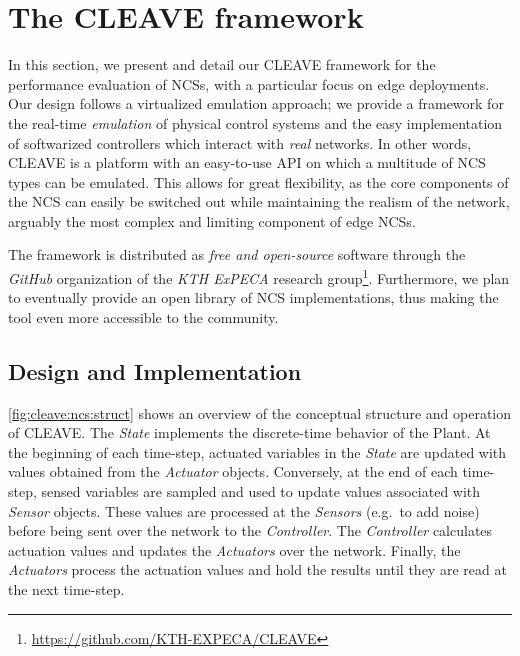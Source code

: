 \section{The \ac{CLEAVE} framework}\label{sec:approach}

In this section, we present and detail our \ac{CLEAVE} framework for the performance evaluation of \aclp{NCS}, with a particular focus on edge deployments.
Our design follows a virtualized emulation approach; we provide a framework for the real-time \emph{emulation} of physical control systems and the easy implementation of softwarized controllers which interact with \emph{real} networks.
In other words, \ac{CLEAVE} is a platform with an easy-to-use \ac{API} on which a multitude of \ac{NCS} types can be emulated.
This allows for great flexibility, as the core components of the \ac{NCS} can easily be switched out while maintaining the realism of the network, arguably the most complex and limiting component of edge \acp{NCS}.

The framework is distributed as \emph{free and open-source} software through the \emph{GitHub} organization of the \emph{KTH ExPECA} research group\footnote{\url{https://github.com/KTH-EXPECA/CLEAVE}}.
Furthermore, we plan to eventually provide an open library of \ac{NCS} implementations, thus making the tool even more accessible to the community.

\subsection{Design and Implementation}

\cref{fig:cleave:ncs:struct} shows an overview of the conceptual structure and operation of \ac{CLEAVE}.
The \emph{State} implements the discrete-time behavior of the Plant.
At the beginning of each time-step, actuated variables in the \emph{State} are updated with values obtained from the \emph{Actuator} objects.
Conversely, at the end of each time-step, sensed variables are sampled and used to update values associated with \emph{Sensor} objects.
These values are processed at the \emph{Sensors} (e.g.\ to add noise) before being sent over the network to the \emph{Controller}.
The \emph{Controller} calculates actuation values and updates the \emph{Actuators} over the network.
Finally, the \emph{Actuators} process the actuation values and hold the results until they are read at the next time-step.

